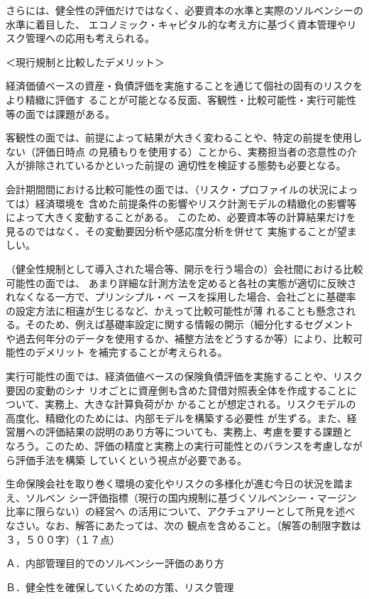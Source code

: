 \documentclass[report,gutter=10mm,fore-edge=10mm,uplatex,dvipdfmx]{jlreq}
\begin{document}
さらには、健全性の評価だけではなく、必要資本の水準と実際のソルベンシーの水準に着目した、
エコノミック・キャピタル的な考え方に基づく資本管理やリスク管理への応用も考えられる。


＜現行規制と比較したデメリット＞

経済価値ベースの資産・負債評価を実施することを通じて個社の固有のリスクをより精緻に評価す
ることが可能となる反面、客観性・比較可能性・実行可能性等の面では課題がある。

客観性の面では、前提によって結果が大きく変わることや、特定の前提を使用しない（評価日時点
の見積もりを使用する）ことから、実務担当者の恣意性の介入が排除されているかといった前提の
適切性を検証する態勢も必要となる。

会計期間間における比較可能性の面では、（リスク・プロファイルの状況によっては）経済環境を
含めた前提条件の影響やリスク計測モデルの精緻化の影響等によって大きく変動することがある。
このため、必要資本等の計算結果だけを見るのではなく、その変動要因分析や感応度分析を併せて
実施することが望ましい。

（健全性規制として導入された場合等、開示を行う場合の）会社間における比較可能性の面では、
あまり詳細な計測方法を定めると各社の実態が適切に反映されなくなる一方で、プリンシプル・ベ
ースを採用した場合、会社ごとに基礎率の設定方法に相違が生じるなど、かえって比較可能性が薄
れることも懸念される。そのため、例えば基礎率設定に関する情報の開示（細分化するセグメント
や過去何年分のデータを使用するか、補整方法をどうするか等）により、比較可能性のデメリット
を補完することが考えられる。

実行可能性の面では、経済価値ベースの保険負債評価を実施することや、リスク要因の変動のシナ
リオごとに資産側も含めた貸借対照表全体を作成することについて、実務上、大きな計算負荷がか
かることが想定される。リスクモデルの高度化、精緻化のためには、内部モデルを構築する必要性
が生ずる。また、経営層への評価結果の説明のあり方等についても、実務上、考慮を要する課題と
なろう。このため、評価の精度と実務上の実行可能性とのバランスを考慮しながら評価手法を構築
していくという視点が必要である。

生命保険会社を取り巻く環境の変化やリスクの多様化が進む今日の状況を踏まえ、ソルベン
シー評価指標（現行の国内規制に基づくソルベンシー・マージン比率に限らない）の経営へ
の活用について、アクチュアリーとして所見を述べなさい。なお、解答にあたっては、次の
観点を含めること。（解答の制限字数は３，５００字）（１７点）

Ａ．内部管理目的でのソルベンシー評価のあり方

Ｂ．健全性を確保していくための方策、リスク管理
\end{document}
